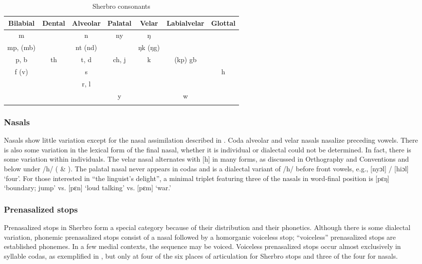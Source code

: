 \begin{table}
\caption{\label{tab:phon:9}Sherbro consonants}

\begin{tabular}{ccccccc}
\lsptoprule
 Bilabial & Dental & Alveolar & Palatal & Velar & Labialvelar & Glottal\\
 \midrule
 m &  & n & ny & ŋ &  & \\
 mp, (mb) &  & nt (nd) &  & ŋk (ŋg) &  & \\
 p, b & th & t, d & ch, j & k & (kp) gb & \\
 f (v) &  & s &  &  &  & h\\
&  & r, l &  &  &  & \\
&  &  & y &  & w & \\
\lspbottomrule
\end{tabular}
\end{table}

\subsubsection{Nasals}
\label{sec:2.1.2.1}
Nasals show little variation except for the nasal assimilation described in . Coda alveolar and velar nasals nasalize preceding vowels. There is also some variation in the lexical form of the final nasal, whether it is individual or dialectal could not be determined. In fact, there is some variation within individuals. The velar nasal alternates with [h] in many forms, as discussed in Orthography and Conventions and below under /h/ ( \& ). The palatal nasal never appears in codas and is a dialectal variant of /h/ before front vowels, e.g., [nyɔl] / [hiɔl] ‘four'. For those interested in “the linguist's delight”, a minimal triplet featuring three of the nasals in word-final position is [pɛŋ] ‘boundary; jump' vs. [pɛn] ‘loud talking' vs. [pɛm] ‘war.'

\subsubsection{Prenasalized stops}
\label{sec:2.1.2.2}
Prenasalized stops in Sherbro form a special category because of their distribution and their phonetics. Although there is some dialectal variation, phonemic prenasalized stops consist of a nasal followed by a homorganic voiceless stop; “voiceless” prenasalized stops are established phonemes. In a few medial contexts, the sequence may be voiced. Voiceless prenasalized stops occur almost exclusively in syllable codas, as exemplified in , but only at four of the six places of articulation for Sherbro stops and three of the four for nasals.


